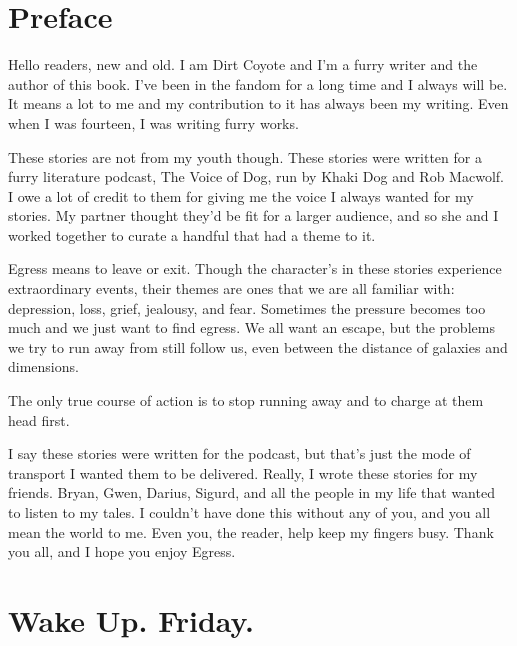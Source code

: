 
\chapter*{Preface}

\vspace{-1.5em}

Hello readers, new and old. I am Dirt Coyote and I'm a furry writer and the author of this book. I've been in the fandom for a long time and I always will be. It means a lot to me and my contribution to it has always been my writing. Even when I was fourteen, I was writing furry works.

These stories are not from my youth though. These stories were written for a furry literature podcast, The Voice of Dog, run by Khaki Dog and Rob Macwolf. I owe a lot of credit to them for giving me the voice I always wanted for my stories. My partner thought they'd be fit for a larger audience, and so she and I worked together to curate a handful that had a theme to it.

Egress means to leave or exit. Though the character's in these stories experience extraordinary events, their themes are ones that we are all familiar with: depression, loss, grief, jealousy, and fear. Sometimes the pressure becomes too much and we just want to find egress. We all want an escape, but the problems we try to run away from still follow us, even between the distance of galaxies and dimensions.

The only true course of action is to stop running away and to charge at them head first.

I say these stories were written for the podcast, but that's just the mode of transport I wanted them to be delivered. Really, I wrote these stories for my friends. Bryan, Gwen, Darius, Sigurd, and all the people in my life that wanted to listen to my tales. I couldn't have done this without any of you, and you all mean the world to me. Even you, the reader, help keep my fingers busy. Thank you all, and I hope you enjoy Egress.

\mainmatter

\cleartoverso
\thispagestyle{empty}


\chapter*{Wake Up. Friday.}



